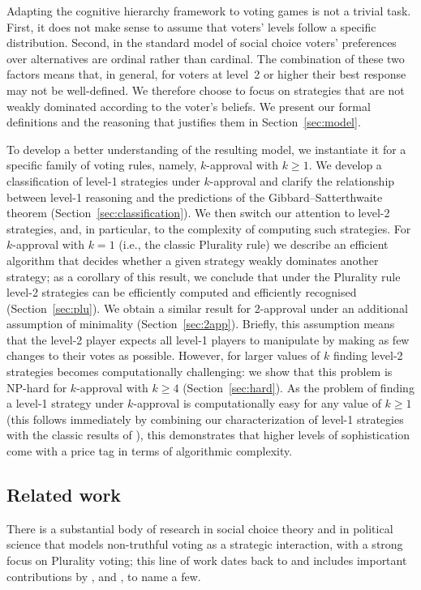 \documentclass[11pt]{article}
\begin{document}
Adapting the cognitive hierarchy framework to voting games is not a trivial task.
First, it does not make sense to assume that voters' levels follow a specific distribution.
Second, in the standard model of social choice voters' preferences over alternatives
are ordinal rather than cardinal. The combination of these two factors means that, 
in general, for voters at level~2 or higher their best response may not be well-defined.
We therefore choose to focus on strategies that are not weakly dominated according
to the voter's beliefs. We present our formal definitions and the reasoning that
justifies them in Section~\ref{sec:model}.

To develop a better understanding of the resulting model, we instantiate it for a specific family
of voting rules, namely, $k$-approval with $k\ge 1$. We develop a classification of level-1 
strategies under $k$-approval and clarify the relationship between level-1 reasoning and the predictions of the 
Gibbard--Satterthwaite theorem (Section~\ref{sec:classification}). We then switch our attention to level-2 strategies, 
and, in particular, to the complexity of computing such strategies.
For $k$-approval with $k=1$ (i.e., the classic Plurality rule) we describe an efficient algorithm 
that decides whether a given strategy weakly dominates another strategy; as a corollary of this result, 
we conclude that under the Plurality rule level-2 strategies can be efficiently computed 
and efficiently recognised (Section~\ref{sec:plu}). We obtain a similar result for 2-approval under an additional assumption
of minimality (Section~\ref{sec:2app}). Briefly, this assumption means that the level-2 player expects all level-1 players
to manipulate by making as few changes to their votes as possible. However, for larger values of $k$
finding level-2 strategies becomes computationally challenging: we show that this problem
is NP-hard for $k$-approval with $k\ge 4$ (Section~\ref{sec:hard}). As the problem of finding a level-1 strategy
under $k$-approval is computationally easy for any value of $k\ge 1$ (this follows immediately
by combining our characterization of level-1 strategies with the classic results of \citet{btt89}),
this demonstrates that higher levels of sophistication come with a price tag in terms
of algorithmic complexity.


\subsection{Related work}\label{sec:related}
There is a substantial body of research in social choice theory and in political science 
that models non-truthful voting as a strategic interaction,
with a strong focus on Plurality voting;
this line of work dates back to \citet{far:b:voting} and includes important contributions 
by \citet{Cain1978}, \citet{fed-sen-wri:j:entry} and \citet{Cox1997}, to name a few. 
\end{document}
